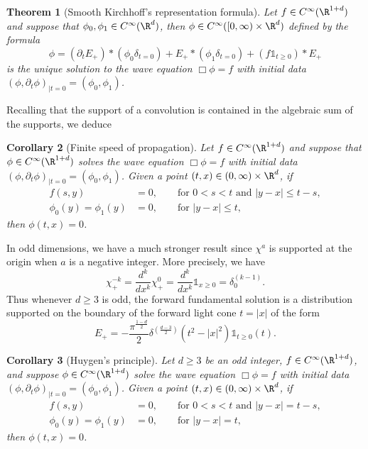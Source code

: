 \documentclass[reqno]{amsart}
\newtheorem{theorem}{Theorem}
\newtheorem{corollary}[theorem]{Corollary}
\theoremstyle{definition}
\theoremstyle{remark}
\begin{document}
\begin{theorem}[Smooth Kirchhoff's representation formula]
	Let $f \in C^\infty (\R^{1 + d})$ and suppose that $\phi_0, \phi_1 \in C^\infty (\R^d)$, then $\phi \in C^\infty ([0, \infty) \times \R^d)$ defined by the formula
		\[ \phi = (\partial_t E_+) * (\phi_0 \delta_{t = 0}) + E_+ * (\phi_1 \delta_{t = 0}) + (f \mathbb 1_{t \geq 0} ) * E_+ \]
	is the unique solution to the wave equation $\Box \phi = f$ with initial data $(\phi, \partial_t \phi)_{|t = 0} = (\phi_0, \phi_1)$.
\end{theorem}

Recalling that the support of a convolution is contained in the algebraic sum of the supports, we deduce

\begin{corollary}[Finite speed of propagation]
	Let $f \in C^\infty (\R^{1 + d})$ and suppose that $\phi \in C^\infty (\R^{1 + d})$ solves the wave equation $\Box \phi = f$ with initial data $(\phi, \partial_t \phi)_{|t = 0} = (\phi_0, \phi_1)$. Given a point $(t, x) \in (0, \infty) \times \R^d$, if
		\begin{align*}
			f (s, y) 
				&= 0, \qquad \text{for $0 < s < t$ and $|y - x| \leq t - s$},\\
			\phi_0 (y) = \phi_1 (y)
				&= 0, \qquad \text{for $|y - x| \leq t$,}	
		\end{align*} 	
	then $\phi(t, x) = 0$. 	
\end{corollary}

In odd dimensions, we have a much stronger result since $\chi^a$ is supported at the origin when $a$ is a negative integer. More precisely, we have
	\[ \chi^{-k}_+  = \frac{d^k}{dx^k} \chi^0_+  = \frac{d^k}{dx^k} \mathbb 1_{x \geq 0} = \delta^{(k - 1)}_0.\]
Thus whenever $d \geq 3$ is odd, the forward fundamental solution is a distribution supported on the boundary of the forward light cone $t = |x|$ of the form
	\[ E_+ = -\frac{\pi^{\frac{1 - d}{2}}}{2} \delta^{\left(\frac{d - 3}{2} \right)} (t^2 - |x|^2) \mathbb 1_{t \geq 0} (t). \]

\begin{corollary}[Huygen's principle]
	Let $d \geq 3$ be an odd integer, $f \in C^\infty (\R^{1 + d})$, and suppose $\phi \in C^\infty (\R^{1 + d})$ solve the wave equation $\Box \phi = f$ with initial data $(\phi, \partial_t \phi)_{|t = 0} = (\phi_0, \phi_1)$. Given a point $(t, x) \in (0, \infty) \times \R^d$, if
		\begin{align*}
			f (s, y) 
				&= 0, \qquad \text{for $0 < s < t$ and $|y - x| = t - s$},\\
			\phi_0 (y) = \phi_1 (y)
				&= 0, \qquad \text{for $|y - x| = t$,}	
		\end{align*} 	
	then $\phi(t, x) = 0$. 	
\end{corollary}
\end{document}
